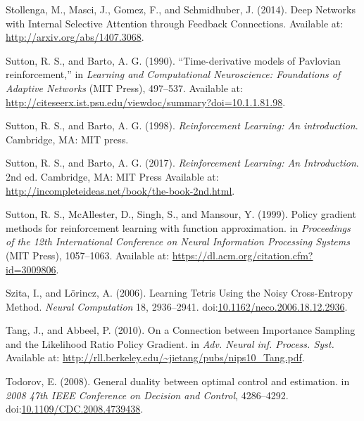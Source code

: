 \documentclass[
  letterpaper,
  DIV=11,
  numbers=noendperiod]{scrreprt}
\newlength{\cslhangindent}
\newlength{\cslentryspacingunit} %
\newenvironment{CSLReferences}[2] %
 {%
  \setlength{\parindent}{0pt}
  \ifodd #1
  \let\oldpar\par
  \def\par{\hangindent=\cslhangindent\oldpar}
  \fi
  \setlength{\parskip}{#2\cslentryspacingunit}
 }%
 {}
\begin{document}
\begin{CSLReferences}{1}{0}
\leavevmode{}%
Stollenga, M., Masci, J., Gomez, F., and Schmidhuber, J. (2014). Deep
{Networks} with {Internal Selective Attention} through {Feedback
Connections}. Available at: \url{http://arxiv.org/abs/1407.3068}.

\leavevmode{}%
Sutton, R. S., and Barto, A. G. (1990). {``Time-derivative models of
{Pavlovian} reinforcement,''} in \emph{Learning and {Computational
Neuroscience}: {Foundations} of {Adaptive Networks}} ({MIT Press}),
497--537. Available at:
\url{http://citeseerx.ist.psu.edu/viewdoc/summary?doi=10.1.1.81.98}.

\leavevmode{}%
Sutton, R. S., and Barto, A. G. (1998). \emph{Reinforcement {Learning}:
{An} introduction}. {Cambridge, MA}: {MIT press}.

\leavevmode{}%
Sutton, R. S., and Barto, A. G. (2017). \emph{Reinforcement {Learning}:
{An Introduction}}. 2nd ed. {Cambridge, MA}: {MIT Press} Available at:
\url{http://incompleteideas.net/book/the-book-2nd.html}.

\leavevmode{}%
Sutton, R. S., McAllester, D., Singh, S., and Mansour, Y. (1999). Policy
gradient methods for reinforcement learning with function approximation.
in \emph{Proceedings of the 12th {International Conference} on {Neural
Information Processing Systems}} ({MIT Press}), 1057--1063. Available
at: \url{https://dl.acm.org/citation.cfm?id=3009806}.

\leavevmode{}%
Szita, I., and Lörincz, A. (2006). Learning {Tetris Using} the {Noisy
Cross-Entropy Method}. \emph{Neural Computation} 18, 2936--2941.
doi:\href{https://doi.org/10.1162/neco.2006.18.12.2936}{10.1162/neco.2006.18.12.2936}.

\leavevmode{}%
Tang, J., and Abbeel, P. (2010). On a {Connection} between {Importance
Sampling} and the {Likelihood Ratio Policy Gradient}. in \emph{Adv.
{Neural} inf. {Process}. {Syst}.} Available at:
\url{http://rll.berkeley.edu/~jietang/pubs/nips10_Tang.pdf}.

\leavevmode{}%
Todorov, E. (2008). General duality between optimal control and
estimation. in \emph{2008 47th {IEEE Conference} on {Decision} and
{Control}}, 4286--4292.
doi:\href{https://doi.org/10.1109/CDC.2008.4739438}{10.1109/CDC.2008.4739438}.


\end{CSLReferences}
\end{document}

